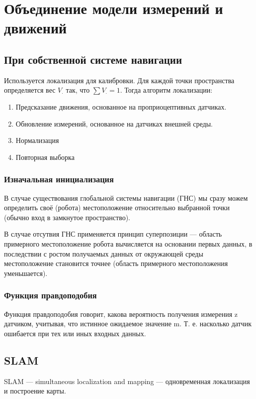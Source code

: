 \documentclass{article}
\begin{document}
\begin{sloppypar}
    \section{Объединение модели измерений и движений}
    \subsection{При собственной системе навигации}
    Используется локализация для калибровки. Для каждой точки пространства определяется вес $V_{\cdot}$ так, что $\sum V_\cdot = 1$. Тогда алгоритм локализации:
    \begin{enumerate}
        \item Предсказание движения, основанное на проприоцептивных датчиках.
        \item Обновление измерений, основанное на датчиках внешней среды.
        \item Нормализация
        \item Повторная выборка
    \end{enumerate}

    \subsubsection{Изначальная инициализация}
    В случае существования глобальной системы навигации (ГНС) мы сразу можем определить своё (робота) местоположение относительно выбранной точки (обычно вход в замкнутое пространство).

    В случае отсутвия ГНС применяется принцип суперпозиции — область примерного местоположение робота вычисляется на основании первых данных, в последствии с ростом получаемых данных от окружающей среды местоположение становится точнее (область примерного местоположения уменьшается).

    \subsubsection{Функция правдоподобия}
    Функция правдоподобия говорит, какова вероятность получения измерения z датчиком, учитывая, что истинное ожидаемое значение m. Т. е. насколько датчик ошибается при тех или иных входных данных.

    \subsection{SLAM}
    SLAM — simultaneous localization and mapping — одновременная локализация и построение карты.


\end{sloppypar}
\end{document}
